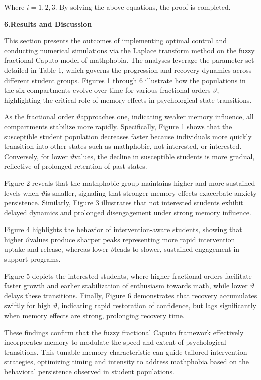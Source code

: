 Where \(i = 1,2,3\). By solving the above equations, the proof is completed.

\textbf{6.Results and Discussion}

This section presents the outcomes of implementing optimal control and conducting numerical simulations via the Laplace transform method on the fuzzy fractional Caputo model of mathphobia. The analyses leverage the parameter set detailed in Table 1, which governs the progression and recovery dynamics across different student groups. Figures 1 through 6 illustrate how the populations in the six compartments evolve over time for various fractional orders \(\vartheta\), highlighting the critical role of memory effects in psychological state transitions.

As the fractional order \(\vartheta\)approaches one, indicating weaker memory influence, all compartments stabilize more rapidly. Specifically, Figure 1 shows that the susceptible student population decreases faster because individuals more quickly transition into other states such as mathphobic, not interested, or interested. Conversely, for lower \(\vartheta\)values, the decline in susceptible students is more gradual, reflective of prolonged retention of past states.

Figure 2 reveals that the mathphobic group maintains higher and more sustained levels when \(\vartheta\)is smaller, signaling that stronger memory effects exacerbate anxiety persistence. Similarly, Figure 3 illustrates that not interested students exhibit delayed dynamics and prolonged disengagement under strong memory influence.

Figure 4 highlights the behavior of intervention-aware students, showing that higher \(\vartheta\)values produce sharper peaks representing more rapid intervention uptake and release, whereas lower \(\vartheta\)leads to slower, sustained engagement in support programs.

Figure 5 depicts the interested students, where higher fractional orders facilitate faster growth and earlier stabilization of enthusiasm towards math, while lower \(\vartheta\)delays these transitions. Finally, Figure 6 demonstrates that recovery accumulates swiftly for high \(\vartheta\), indicating rapid restoration of confidence, but lags significantly when memory effects are strong, prolonging recovery time.

These findings confirm that the fuzzy fractional Caputo framework effectively incorporates memory to modulate the speed and extent of psychological transitions. This tunable memory characteristic can guide tailored intervention strategies, optimizing timing and intensity to address mathphobia based on the behavioral persistence observed in student populations.

